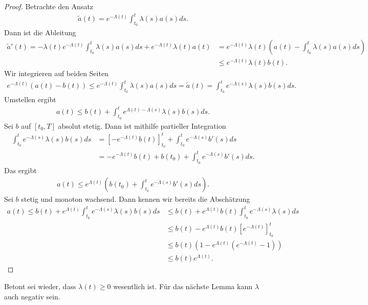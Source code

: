 \documentclass[a4paper]{article}
\theoremstyle{definition}
\begin{document}
\begin{proof}
    Betrachte den Ansatz 
\begin{align*}
    \tilde{a}(t) = e^{-\Lambda(t)}\int^t_{t_0} \lambda(s) a(s) ds.
\end{align*}
Dann ist die Ableitung 
\begin{align*}
    \tilde{a}'(t) = -\lambda(t) e^{-\Lambda(t)}\int^t_{t_0} \lambda(s) a(s) ds + e^{-\Lambda(t)}\lambda(t) a(t) &= e^{-\Lambda(t)} \lambda(t) \left(a(t) - \int^t_{t_0} \lambda(s) a(s) ds\right) \\ &\leq e^{-\Lambda(t)} \lambda(t) b(t).
\end{align*}
Wir integrieren auf beiden Seiten 
\begin{align*}
    e^{-\Lambda(t)}(a(t) - b(t)) \leq e^{-\Lambda(t)}\int^t_{t_0}\lambda(s)a(s)ds = \tilde{a}(t) = \int^t_{t_0} e^{-\Lambda(s)}\lambda(s)b(s)ds.
\end{align*}
Umstellen ergibt 
\begin{align*}
    a(t) \leq b(t) + \int^t_{t_0}e^{\Lambda(t)-\Lambda(s)}\lambda(s)b(s)ds.
\end{align*}
Sei $b$ auf $[t_0, T]$ absolut stetig. Dann ist mithilfe partieller Integration
\begin{align*}
    \int^t_{t_0} e^{-\Lambda(s)}\lambda(s)b(s)ds &= [-e^{-\Lambda(t)}b(t)]^t_{t_0} + \int^t_{t_0} e^{-\Lambda(s)}b'(s)ds \\
    &= -e^{-\Lambda(t)}b(t) + b(t_0) + \int^t_{t_0} e^{-\Lambda(s)}b'(s)ds.
\end{align*}
Das ergibt 
\begin{align*}
    a(t) \leq e^{\Lambda(t)}\left(b(t_0) + \int^t_{t_0} e^{-\Lambda(s)}b'(s)ds\right).
\end{align*}
Sei $b$ stetig und monoton wachsend. Dann kennen wir bereits die Abschätzung 
\begin{align*}
    a(t) 
    \leq b(t) + e^{\Lambda(t)} \int^t_{t_0} e^{-\Lambda(s)}\lambda(s)b(s) ds 
    &\leq b(t) + e^{\Lambda(t)}b(t) \int^t_{t_0} e^{-\Lambda(s)}\lambda(s) ds \\
    &\leq b(t) - e^{\Lambda(t)}b(t)[e^{-\Lambda(t)}]^t_{t_0} \\
    &\leq b(t) (1 - e^{\Lambda(t)}(e^{-\Lambda(t)} - 1)) \\
    &\leq b(t)e^{\Lambda(t)}.
\end{align*}
\end{proof}

Betont sei wieder, dass $\lambda(t) \geq 0$ wesentlich ist. Für das nächste Lemma kann $\lambda$ auch negativ sein.
\end{document}
